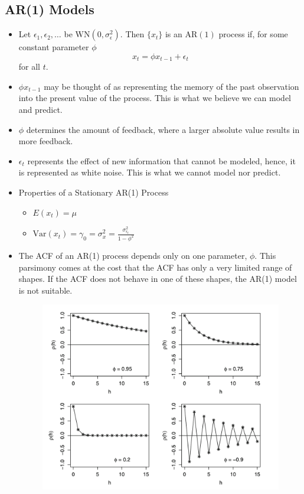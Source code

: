 \documentclass[11pt]{article}
\begin{document}
\subsection{AR(1) Models}
\begin{itemize}
    \item Let $\epsilon_1, \epsilon_2, \ldots$ be $\text{WN}(0, \sigma_{\epsilon}^{2})$. Then 
    $\{x_t\}$ is an $\text{AR}(1)$ process if, for some constant parameter $\phi$
    \[ x_t = \phi x_{t-1} + \epsilon_t \]
    for all $t$.
    \item $\phi x_{t-1}$ may be thought of as representing the memory of the past observation
    into the present value of the process. This is what we believe we can model and predict.
    \item $\phi$ determines the amount of feedback, where a larger absolute value results in 
    more feedback.
    \item $\epsilon_t$ represents the effect of new information that cannot be modeled, hence,
    it is represented as white noise. This is what we cannot model nor predict. 
    \item Properties of a Stationary AR(1) Process 
    \begin{itemize}
        \item $E(x_t) = \mu$ 
        \item $\text{Var}(x_t)= \gamma_0 = \sigma_x^2 = \frac{\sigma_{\epsilon_t}^{2}}{1-
        \phi^2}$
    \end{itemize}
    \item The ACF of an AR(1) process depends only on one parameter, $\phi$. This parsimony 
    comes at the cost that the ACF has only a very limited range of shapes. If the ACF does not
    behave in one of these shapes, the AR(1) model is not suitable.
    \begin{figure}[H] 
        \centering 
        \includegraphics[width=5in]{imgs/ar1_acf.png}

\end{figure}
\end{itemize}
\end{document}
